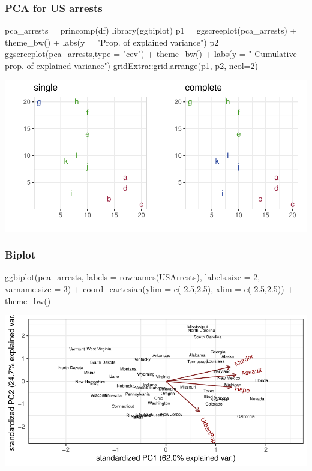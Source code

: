 \documentclass[a4paper]{article}\usepackage[]{graphicx}\usepackage[]{xcolor}
\makeatletter
\def\maxwidth{ %
  \ifdim\Gin@nat@width>\linewidth
    \linewidth
  \else
    \Gin@nat@width
  \fi
}
\makeatother
\begin{document}
\subsubsection{PCA for US arrests}
\begin{Schunk}
\begin{Sinput}
pca_arrests = princomp(df)
library(ggbiplot)
p1 = ggscreeplot(pca_arrests) +
  theme_bw() + labs(y = "Prop. of explained variance")
p2 = ggscreeplot(pca_arrests,type = "cev") + theme_bw() + labs(y = " Cumulative prop. of explained variance")
gridExtra::grid.arrange(p1, p2, ncol=2)
\end{Sinput}


{\centering \includegraphics[width=\maxwidth]{figure/listings-unnamed-chunk-496-1} 

}

\end{Schunk}
\subsubsection{Biplot}
\begin{Schunk}
\begin{Sinput}
ggbiplot(pca_arrests,
         labels = rownames(USArrests),
         labels.size = 2,
         varname.size = 3) + 
  coord_cartesian(ylim = c(-2.5,2.5), xlim = c(-2.5,2.5)) +
  theme_bw()
\end{Sinput}


{\centering \includegraphics[width=\maxwidth]{figure/listings-unnamed-chunk-497-1} 

}

\end{Schunk}
\end{document}
